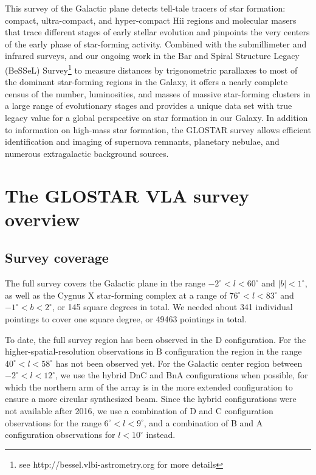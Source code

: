 \documentclass{aa}
\begin{document}
This survey of the Galactic plane detects tell-tale tracers of star formation: compact, ultra-compact,  and hyper-compact H{\sc ii} regions and molecular masers that trace different stages of early stellar evolution and pinpoints the very centers of the early phase of star-forming activity. Combined with the submillimeter and infrared surveys, and our ongoing work in the Bar and Spiral Structure Legacy (BeSSeL)
Survey\footnote{see http://bessel.vlbi-astrometry.org for more details} to measure distances by trigonometric parallaxes to most of the dominant star-forming regions in the Galaxy, it offers a nearly complete census of the number, luminosities, and masses of massive star-forming clusters in a large range of evolutionary stages and provides a unique  data set with true legacy value for a global perspective on star formation in our Galaxy. In addition to information on high-mass star formation, the GLOSTAR survey allows efficient identification and imaging of supernova remnants, planetary nebulae, and numerous extragalactic background sources.

  
\section{The GLOSTAR VLA survey overview}

\subsection{Survey coverage}
The full survey covers the Galactic plane  in the range  $-2^\circ<l<60^\circ$ and $|b|<1^\circ$, as well as the Cygnus X star-forming complex at a range of $76^\circ<l<83^\circ$ and $-1^\circ<b<2^\circ$, or 145 square degrees in total. We needed about 341 individual pointings to cover one square degree, or 49463 pointings in total.

To date, the full survey region has been observed in the D configuration. For the higher-spatial-resolution observations in  B configuration the region in the range $40^\circ<l<58^\circ$ has not been observed yet. For the Galactic center region between $-2^\circ<l<12^\circ$, we use the hybrid DnC and BnA configurations when possible, for which the northern arm of the array is in the more extended configuration to ensure a more circular synthesized beam. Since the hybrid configurations were not available after 2016, we use a combination of D and C configuration observations for the range  $6^\circ<l<9^\circ$, and a combination of B and A configuration observations for $l<10^\circ$ instead.
\end{document}
